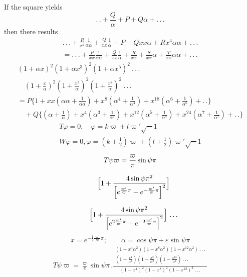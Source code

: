 \noindent If the square yields
\[
.\,.+\frac{Q}{\alpha}+P+Q\alpha+ .\,.\,.
\]
\noindent then there results
\[
\begin{gathered}
.\,.\,.+\frac{R}{x^{4}}\frac1{\alpha\alpha}+\frac{Q}{xx}\frac1\alpha
+P+Qxx\alpha+Rx^{4}\alpha\alpha+ .\,.\,.
\\[7pt]
=.\,.\,.+\frac{P}{xx}\frac1{\alpha\alpha}+\frac{Q}{xx}\frac1\alpha
+\frac{R}{xx}+\frac{S}{xx}\alpha+\frac{T}{xx}\alpha\alpha+ .\,.\,.
\end{gathered}
\]
\[
\begin{gathered}
(1+\alpha x)^{2}(1+\alpha x^{3})^{2}(1+\alpha x^{5})^{2}\ .\,.\,.
\\[7pt]\quad{}(1+\tfrac{x}{\alpha})^{2}(1+\tfrac{x^{3}}{\alpha})^{2}(1+\tfrac{x^{5}}{\alpha})^{2}\ .\,.\,.
\\[7pt]
=P\{1+xx(\alpha\alpha+\tfrac1{\alpha\alpha})
+x^{8}(\alpha^{4}+\tfrac1{\alpha^{4}})
+x^{18}(\alpha^{6}+\tfrac1{\alpha^{6}})+ .\,.\}
\\[7pt]
\quad+Q\{(\alpha+\tfrac1\alpha)
+x^{4}(\alpha^{3}+\tfrac1{\alpha^{3}})
+x^{12}(\alpha^{5}+\tfrac1{\alpha^{5}})
+x^{24}(\alpha^{7}+\tfrac1{\alpha^{7}})+ .\,.\}
\end{gathered}
\]
\[
\begin{gathered}
T\varphi=0,\quad \varphi=k\varpi+l\varpi'\surd-1
\\[7pt]
W\varphi=0, \varphi=(k+\tfrac12)\varpi+(l+\tfrac12)\varpi'\surd-1
\end{gathered}
\]
\[
\begin{gathered}T\psi\varpi=\frac{\varpi}{\pi}\sin\psi\pi
\\[7pt]\quad{}\Bigl[1+\frac{4\sin\psi\pi^{2}}
{\Bigl[e^{\frac{\varpi'}{\varpi}\pi}-e^{-\frac{\varpi'}{\varpi}\pi}\Bigr]^{2}}\Bigr]
\\[7pt]\quad{}\Bigl[1+\frac{4\sin\psi\pi^{2}}
{\Bigl[e^{2\frac{\varpi'}{\varpi}\pi}-e^{-2\frac{\varpi'}{\varpi}\pi}\Bigr]^{2}}\Bigr]\ .\,.\,.\end{gathered}
\]
\[
x=e^{-\frac12\frac{\varpi'}{\varpi}\pi};\qquad
\alpha=\cos\psi\pi+\varepsilon\sin\psi\pi
\]
\[
\begin{gathered}T\psi\varpi=\frac{\varpi}{\pi}\sin\psi\pi\,.
\frac{\begin{gathered}(1-x^{4}\alpha^{2})(1-x^{8}\alpha^{2})(1-x^{12}\alpha^{2})\ .\,.\,.
\\[5pt](1-\frac{x^{4}}{\alpha^{2}})(1-\frac{x^{8}}{\alpha^{2}})(1-\frac{x^{12}}{\alpha^{2}})\ .\,.\,.\end{gathered}}
{(1-x^{4})^{2}(1-x^{8})^{2}(1-x^{12})^{2}\ .\,.\,.}\end{gathered}
\]
